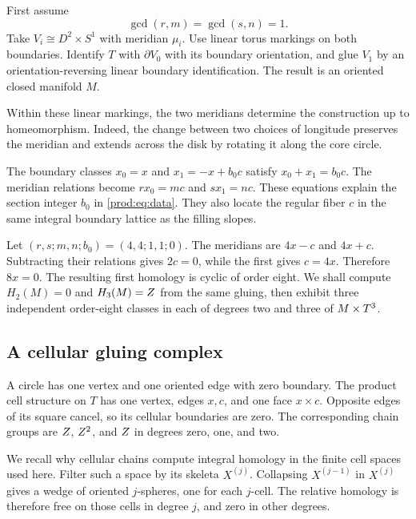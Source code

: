 First assume
\begin{equation}\label{prod:eq:effective}
                         \gcd(r,m)=\gcd(s,n)=1.
\end{equation}
Take $V_i\cong D^2\times S^1$ with meridian $\mu_i$.
Use linear torus markings on both boundaries.
Identify $T$ with $\partial V_0$ with its boundary orientation, and glue
$V_1$ by an orientation-reversing linear boundary identification.
The result is an oriented closed manifold $M$.

Within these linear markings, the two meridians determine the construction
up to homeomorphism.
Indeed, the change between two choices of longitude preserves the meridian
and extends across the disk by rotating it along the core circle.

The boundary classes $x_0=x$ and $x_1=-x+b_0c$ satisfy
$x_0+x_1=b_0c$.  The meridian relations become
$rx_0=mc$ and $sx_1=nc$.  These equations explain the section integer
$b_0$ in \eqref{prod:eq:data}.  They also locate the regular fiber $c$ in the
same integral boundary lattice as the filling slopes.

\begin{example}\label{prod:ex:eight}
Let $(r,s;m,n;b_0)=(4,4;1,1;0)$.  The meridians are
$4x-c$ and $4x+c$.  Subtracting their relations gives $2c=0$,
while the first gives $c=4x$.  Therefore $8x=0$.
The resulting first homology is cyclic of order eight.
We shall compute $H_2(M)=0$ and $H_3(M)=Z$ from the same gluing,
then exhibit three independent order-eight classes in each of degrees
two and three of $M\times T^3$.
\end{example}

\subsection{A cellular gluing complex}

A circle has one vertex and one oriented edge with zero boundary.
The product cell structure on $T$ has one vertex, edges $x,c$, and
one face $x\times c$.  Opposite edges of its square cancel, so its
cellular boundaries are zero.
The corresponding chain groups are $Z$, $Z^2$, and $Z$ in
degrees zero, one, and two.

We recall why cellular chains compute integral homology in the finite
cell spaces used here.  Filter such a space by its skeleta $X^{(j)}$.
Collapsing $X^{(j-1)}$ in $X^{(j)}$ gives a wedge of oriented
$j$-spheres, one for each $j$-cell.  The relative homology is therefore
free on those cells in degree $j$, and zero in other degrees.

